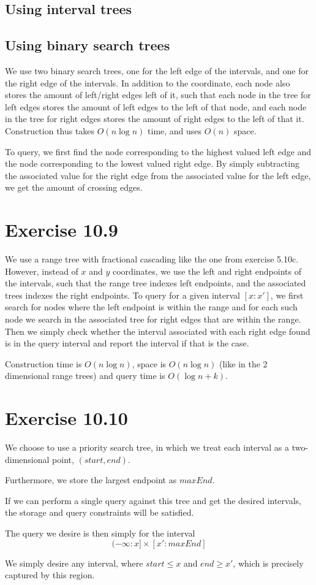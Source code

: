\documentclass[11pt,a4paper]{article}
\begin{document}
\subsection{Using interval trees}


\subsection{Using binary search trees}

We use two binary search trees, one for the left edge of the
intervals, and one for the right edge of the intervals. In addition to
the coordinate, each node also stores the amount of left/right edges
left of it, such that each node in the tree for left edges stores the
amount of left edges to the left of that node, and each node in the
tree for right edges stores the amount of right edges to the left of
that it. Construction thus takes $O(n \log n)$ time, and uses $O(n)$
space.

To query, we first find the node corresponding to the highest valued
left edge and the node corresponding to the lowest valued right
edge. By simply subtracting the associated value for the right edge
from the associated value for the left edge, we get the amount of
crossing edges.

\section{Exercise 10.9}

We use a range tree with fractional cascading like the one from
exercise 5.10c. However, instead of $x$ and $y$ coordinates, we use
the left and right endpoints of the intervals, such that the range
tree indexes left endpoints, and the associated trees indexes the
right endpoints. To query for a given interval $[x:x']$, we first
search for nodes where the left endpoint is within the range and for
each such node we search in the associated tree for right edges that
are within the range. Then we simply check whether the interval
associated with each right edge found is in the query interval and
report the interval if that is the case.

Construction time is $O(n \log n)$, space is $O(n \log n)$ (like in
the 2 dimensional range trees) and query time is $O(\log n + k)$.

\section{Exercise 10.10}

We choose to use a priority search tree, in which we treat each
interval as a two-dimensional point, $(start, end)$.

Furthermore, we store the largest endpoint as $maxEnd$.

If we can perform a single query against this tree and get the desired
intervals, the storage and query constraints will be satisfied.

The query we desire is then simply for the interval \[
    (-\infty : x] \times [x' : maxEnd] 
\]

We simply desire any interval, where $start \leq x$ and
$end \geq x'$, which is precisely captured by this region.
\end{document}

